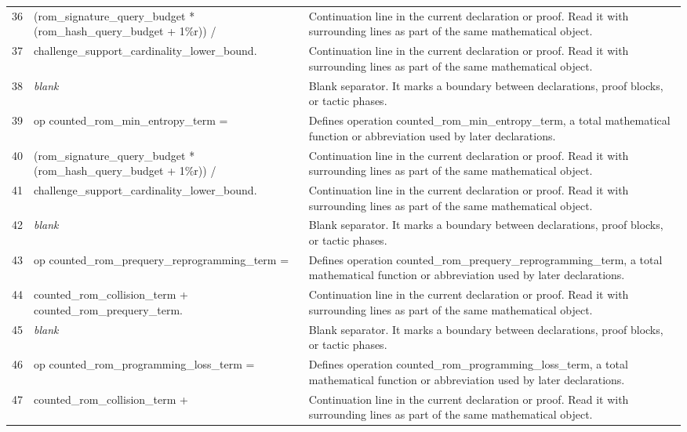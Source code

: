 \documentclass[10pt]{article}
\begin{document}
\begin{longtable}{r L{0.53\textwidth} L{0.37\textwidth}}
36 & {\ttfamily\scriptsize   (rom\_signature\_query\_budget * (rom\_hash\_query\_budget + 1\%r)) /} & Continuation line in the current declaration or proof.  Read it with surrounding lines as part of the same mathematical object. \\
37 & {\ttfamily\scriptsize     challenge\_support\_cardinality\_lower\_bound.} & Continuation line in the current declaration or proof.  Read it with surrounding lines as part of the same mathematical object. \\
38 & {\ttfamily\scriptsize \emph{blank}} & Blank separator.  It marks a boundary between declarations, proof blocks, or tactic phases. \\
39 & {\ttfamily\scriptsize op counted\_rom\_min\_entropy\_term =} & Defines operation counted\_rom\_min\_entropy\_term, a total mathematical function or abbreviation used by later declarations. \\
40 & {\ttfamily\scriptsize   (rom\_signature\_query\_budget * (rom\_hash\_query\_budget + 1\%r)) /} & Continuation line in the current declaration or proof.  Read it with surrounding lines as part of the same mathematical object. \\
41 & {\ttfamily\scriptsize     challenge\_support\_cardinality\_lower\_bound.} & Continuation line in the current declaration or proof.  Read it with surrounding lines as part of the same mathematical object. \\
42 & {\ttfamily\scriptsize \emph{blank}} & Blank separator.  It marks a boundary between declarations, proof blocks, or tactic phases. \\
43 & {\ttfamily\scriptsize op counted\_rom\_prequery\_reprogramming\_term =} & Defines operation counted\_rom\_prequery\_reprogramming\_term, a total mathematical function or abbreviation used by later declarations. \\
44 & {\ttfamily\scriptsize   counted\_rom\_collision\_term + counted\_rom\_prequery\_term.} & Continuation line in the current declaration or proof.  Read it with surrounding lines as part of the same mathematical object. \\
45 & {\ttfamily\scriptsize \emph{blank}} & Blank separator.  It marks a boundary between declarations, proof blocks, or tactic phases. \\
46 & {\ttfamily\scriptsize op counted\_rom\_programming\_loss\_term =} & Defines operation counted\_rom\_programming\_loss\_term, a total mathematical function or abbreviation used by later declarations. \\
47 & {\ttfamily\scriptsize   counted\_rom\_collision\_term +} & Continuation line in the current declaration or proof.  Read it with surrounding lines as part of the same mathematical object. \\

\end{longtable}
\end{document}

